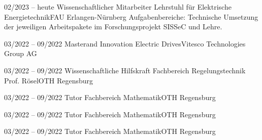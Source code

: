



\vspace{10pt}

\cvevent
{02/2023 -- heute}
{Wissenschaftlicher Mitarbeiter}
{Lehrstuhl für Elektrische Energietechnik\newline FAU Erlangen-Nürnberg}
{Aufgabenbereiche: Technische Umsetzung der jeweiligen Arbeitspakete im Forschungsprojekt SISSeC und Lehre. }
\vfill\null

\cvevent
{03/2022 -- 09/2022}
{Masterand}
{Innovation Electric Drives\newline Vitesco Technologies Group AG}
{}
\vfill\null

\cvevent
{03/2022 -- 09/2022}
{Wissenschaftliche Hilfskraft}
{Fachbereich Regelungstechnik Prof. Rösel\newline OTH Regensburg}
{}
\vfill\null

\cvevent
{03/2022 -- 09/2022}
{Tutor}
{Fachbereich Mathematik\newline OTH Regensburg}
{}
\vfill\null

\cvevent
{03/2022 -- 09/2022}
{Tutor}
{Fachbereich Mathematik\newline OTH Regensburg}
{}
\vfill\null

\cvevent
{03/2022 -- 09/2022}
{Tutor}
{Fachbereich Mathematik\newline OTH Regensburg}
{}
\vfill\null

